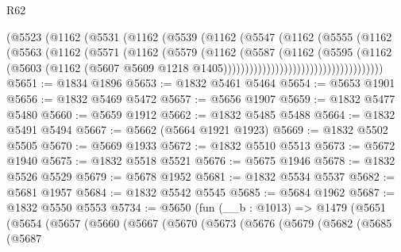 \begin{lexlean}{R62}
\begin{coremodule}
                                (@5523
                                  (@1162
                                    (@5531
                                      (@1162
                                        (@5539
                                          (@1162
                                            (@5547
                                              (@1162
                                                (@5555
                                                  (@1162
                                                    (@5563
                                                      (@1162
                                                        (@5571
                                                          (@1162
                                                            (@5579
                                                              (@1162
                                                                (@5587
                                                                  (@1162
                                                                    (@5595
                                                                      (@1162
                                                                        (@5603
                                                                          (@1162
                                                                            (@5607
                                                                              @5609
                                                                              @1218
                                                                              @1405)))))))))))))))))))))))))))))))))))))
@5651 := @1834 @1896
@5653 := @1832 @5461 @5464
@5654 := @5653 @1901
@5656 := @1832 @5469 @5472
@5657 := @5656 @1907
@5659 := @1832 @5477 @5480
@5660 := @5659 @1912
@5662 := @1832 @5485 @5488
@5664 := @1832 @5491 @5494
@5667 := @5662 (@5664 @1921 @1923)
@5669 := @1832 @5502 @5505
@5670 := @5669 @1933
@5672 := @1832 @5510 @5513
@5673 := @5672 @1940
@5675 := @1832 @5518 @5521
@5676 := @5675 @1946
@5678 := @1832 @5526 @5529
@5679 := @5678 @1952
@5681 := @1832 @5534 @5537
@5682 := @5681 @1957
@5684 := @1832 @5542 @5545
@5685 := @5684 @1962
@5687 := @1832 @5550 @5553
@5734 := @5650
    (fun (__b : @1013) =>
    @1479
      (@5651
        (@5654
          (@5657
            (@5660
              (@5667
                (@5670
                  (@5673
                    (@5676
                      (@5679
                        (@5682
                          (@5685
                            (@5687

\end{coremodule}
\end{lexlean}

